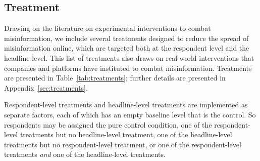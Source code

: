 \documentclass[letterpaper, 12pt, parskip=full,DIV=10]{scrartcl}
\begin{document}
\subsection{Treatment}
Drawing on the literature on experimental interventions to combat misinformation, we include several treatments designed to reduce the spread of misinformation online, which are targeted both at the respondent level and the headline level. This list of treatments also draws on real-world interventions that companies and platforms have instituted to combat misinformation. Treatments are presented in Table~\ref{tab:treatments}; further details are presented in Appendix~\ref{sec:treatments}. 

Respondent-level treatments and headline-level treatments are implemented as separate factors, each of which has an empty baseline level that is the control. So respondents may be assigned the pure control condition, one of the respondent-level treatments but no headline-level treatment, one of the headline-level treatments but no respondent-level treatment, or one of the respondent-level treatments \textit{and} one of the headline-level treatments. 
\end{document}
